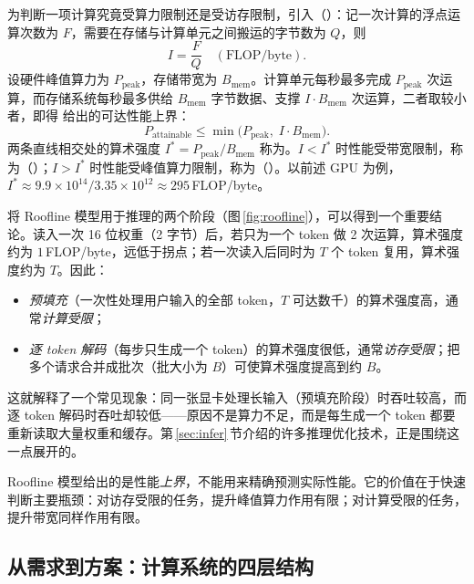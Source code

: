 为判断一项计算究竟受算力限制还是受访存限制，引入（）：记一次计算的浮点运算次数为 $F$，需要在存储与计算单元之间搬运的字节数为 $Q$，则
\begin{equation}
  I = \frac{F}{Q}\quad(\text{FLOP/byte}).
\end{equation}
设硬件峰值算力为 $P_{\mathrm{peak}}$，存储带宽为 $B_{\mathrm{mem}}$。计算单元每秒最多完成 $P_{\mathrm{peak}}$ 次运算，而存储系统每秒最多供给 $B_{\mathrm{mem}}$ 字节数据、支撑 $I\cdot B_{\mathrm{mem}}$ 次运算，二者取较小者，即得 \cite{williams2009roofline}给出的可达性能上界：
\begin{equation}
  P_{\mathrm{attainable}} \le \min\bigl(P_{\mathrm{peak}},\; I\cdot B_{\mathrm{mem}}\bigr).
  \label{eq:roofline}
\end{equation}
两条直线相交处的算术强度 $I^{*}=P_{\mathrm{peak}}/B_{\mathrm{mem}}$ 称为。$I<I^{*}$ 时性能受带宽限制，称为（）；$I>I^{*}$ 时性能受峰值算力限制，称为（）。以前述 GPU 为例，$I^{*}\approx 9.9\times10^{14}/3.35\times10^{12}\approx 295$\,FLOP/byte。



将 Roofline 模型用于推理的两个阶段（图\,\ref{fig:roofline}），可以得到一个重要结论。读入一次 16 位权重（2 字节）后，若只为一个 token 做 2 次运算，算术强度约为 $1$\,FLOP/byte，远低于拐点；若一次读入后同时为 $T$ 个 token 复用，算术强度约为 $T$。因此：
\begin{itemize}
  \item \emph{预填充}（一次性处理用户输入的全部 token，$T$ 可达数千）的算术强度高，通常\emph{计算受限}；
  \item \emph{逐 token 解码}（每步只生成一个 token）的算术强度很低，通常\emph{访存受限}；把多个请求合并成批次（批大小为 $B$）可使算术强度提高到约 $B$。
\end{itemize}
这就解释了一个常见现象：同一张显卡处理长输入（预填充阶段）时吞吐较高，而逐 token 解码时吞吐却较低——原因不是算力不足，而是每生成一个 token 都要重新读取大量权重和缓存。第\,\ref{sec:infer}\,节介绍的许多推理优化技术，正是围绕这一点展开的。

\begin{pitfall}
Roofline 模型给出的是性能\emph{上界}，不能用来精确预测实际性能。它的价值在于快速判断主要瓶颈：对访存受限的任务，提升峰值算力作用有限；对计算受限的任务，提升带宽同样作用有限。
\end{pitfall}

\subsection{从需求到方案：计算系统的四层结构}
\label{subsec:four-layers}

